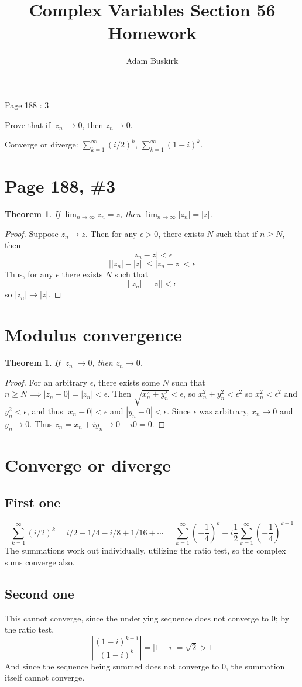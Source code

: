 \documentclass{article}
\title{Complex Variables Section 56 Homework}
\author{Adam Buskirk}
\newtheorem{theorem}[subsection]{Theorem}
\theoremstyle{definition}
\newcommand{\p}[1]{\left(#1\right)}
\newcommand{\abs}[1]{\left|#1\right|}
\begin{document}
\maketitle

Page 188 : 3

Prove that if $\abs{z_n} \to 0$, then $z_n \to 0$.

Converge or diverge: $\sum_{k=1}^\infty (i/2)^k$, 
$\sum_{k=1}^\infty (1-i)^k$.

\section{Page 188, \#3}
\begin{theorem}
If $\lim_{n\to\infty} z_n = z$, then $\lim_{n \to \infty} \abs{z_n} = \abs{z}$.
\end{theorem}
\begin{proof}
Suppose $z_n \to z$. Then for any $\epsilon>0$, there exists $N$ such that if
$n \ge N$, then
\[
\abs{z_n - z} < \epsilon
\]
\[
\abs{\abs{z_n}-\abs{z}} \le \abs{z_n - z} < \epsilon
\]
Thus, for any $\epsilon$ there exists $N$ such that 
\[ \abs{\abs{z_n} - \abs{z}} < \epsilon \]
so $\abs{z_n} \to \abs{z}$.
\end{proof}

\section{Modulus convergence}
\begin{theorem}
If $|z_n| \to 0$, then $z_n \to 0$.
\end{theorem}
\begin{proof}
For an arbitrary $\epsilon$, 
there exists some $N$ such that
$n \ge N \implies |z_n - 0| = |z_n| < \epsilon$.
Then $\sqrt{x_n^2 + y_n^2} < \epsilon$, so
$x_n^2 + y_n^2 < \epsilon^2$
so $x_n^2 < \epsilon^2$ and $y_n^2 < \epsilon$, 
and thus $\abs{x_n-0} < \epsilon$ and 
$\abs{y_n-0} < \epsilon$. Since
$\epsilon$ was arbitrary, $x_n \to 0$ and $y_n \to 0$.
Thus $z_n = x_n + i y_n \to 0 + i 0 = 0$.
\end{proof}

\section{Converge or diverge}
\subsection{First one}
\[ 
\sum_{k=1}^\infty (i/2)^k
= i/2 - 1/4 - i/8 + 1/16 + \cdots
= \sum_{k=1}^\infty \p{-\frac{1}{4}}^k 
- i \frac{1}{2} \sum_{k=1}^\infty \p{-\frac{1}{4}}^{k-1}
\]
The summations work out individually, utilizing the ratio test, 
so the complex sums converge also.

\subsection{Second one}
This cannot converge, since the underlying sequence does not converge
to $0$; by the ratio test,
\[ \abs{\frac{(1-i)^{k+1}}{(1-i)^k}} = \abs{1-i} = \sqrt{2} > 1 \]
And since the sequence being summed does not converge to $0$, the summation
itself cannot converge.
\end{document}
